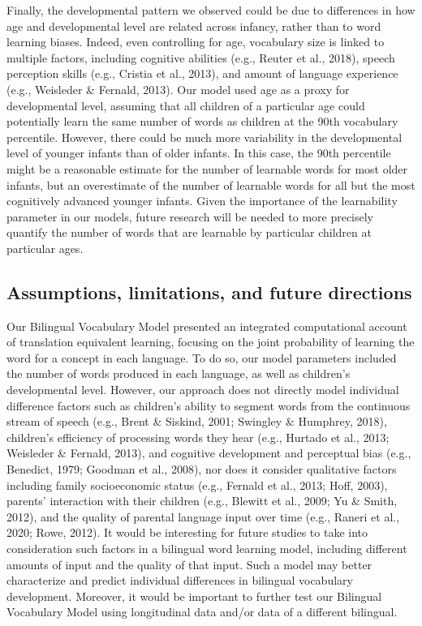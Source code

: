 \documentclass[
  english,
  ,man,floatsintext]{apa6}
\begin{document}
Finally, the developmental pattern we observed could be due to differences in how age and developmental level are related across infancy, rather than to word learning biases. Indeed, even controlling for age, vocabulary size is linked to multiple factors, including cognitive abilities (e.g., Reuter et al., 2018), speech perception skills (e.g., Cristia et al., 2013), and amount of language experience (e.g., Weisleder \& Fernald, 2013). Our model used age as a proxy for developmental level, assuming that all children of a particular age could potentially learn the same number of words as children at the 90th vocabulary percentile. However, there could be much more variability in the developmental level of younger infants than of older infants. In this case, the 90th percentile might be a reasonable estimate for the number of learnable words for most older infants, but an overestimate of the number of learnable words for all but the most cognitively advanced younger infants. Given the importance of the learnability parameter in our models, future research will be needed to more precisely quantify the number of words that are learnable by particular children at particular ages.

\hypertarget{assumptions-limitations-and-future-directions}{%
\subsection{Assumptions, limitations, and future directions}\label{assumptions-limitations-and-future-directions}}

Our Bilingual Vocabulary Model presented an integrated computational account of translation equivalent learning, focusing on the joint probability of learning the word for a concept in each language. To do so, our model parameters included the number of words produced in each language, as well as children's developmental level. However, our approach does not directly model individual difference factors such as children's ability to segment words from the continuous stream of speech (e.g., Brent \& Siskind, 2001; Swingley \& Humphrey, 2018), children's efficiency of processing words they hear (e.g., Hurtado et al., 2013; Weisleder \& Fernald, 2013), and cognitive development and perceptual bias (e.g., Benedict, 1979; Goodman et al., 2008), nor does it consider qualitative factors including family socioeconomic status (e.g., Fernald et al., 2013; Hoff, 2003), parents' interaction with their children (e.g., Blewitt et al., 2009; Yu \& Smith, 2012), and the quality of parental language input over time (e.g., Raneri et al., 2020; Rowe, 2012). It would be interesting for future studies to take into consideration such factors in a bilingual word learning model, including different amounts of input and the quality of that input. Such a model may better characterize and predict individual differences in bilingual vocabulary development. Moreover, it would be important to further test our Bilingual Vocabulary Model using longitudinal data and/or data of a different bilingual.
\end{document}

